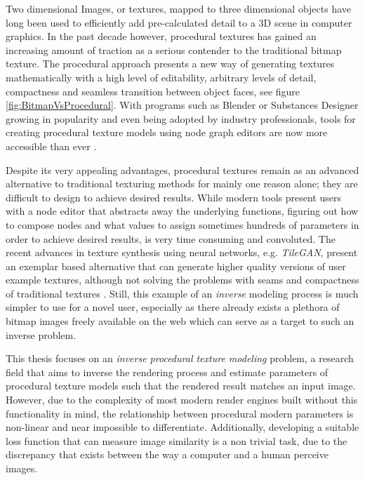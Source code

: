 Two dimensional Images, or textures, mapped to three dimensional objects have long been used to efficiently add pre-calculated detail to a 3D scene in computer graphics. In the past decade however, procedural textures has gained an increasing amount of traction as a serious contender to the traditional bitmap texture. The procedural approach presents a new way of generating textures mathematically with a high level of editability, arbitrary levels of detail, compactness and seamless transition between object faces, see figure \ref{fig:BitmapVsProcedural}. With programs such as Blender or Substances Designer growing in popularity and even being adopted by industry professionals, tools for creating procedural texture models using node graph editors are now more accessible than ever \cite{blenderfoundation_2020_blenderorg, a2020_substance}. 

Despite its very appealing advantages, procedural textures remain as an advanced alternative to traditional texturing methods for mainly one reason alone; they are difficult to design to achieve desired results. While modern tools present users with a node editor that abstracts away the underlying functions, figuring out how to compose nodes and what values to assign sometimes hundreds of parameters in order to achieve desired results, is very time consuming and convoluted. The recent advances in texture synthesis using neural networks, e.g. \textit{TileGAN}, present an exemplar based alternative that can generate higher quality versions of user example textures, although not solving the problems with seams and compactness of traditional textures \cite{frhstck_2019_tilegan}. Still, this example of an \textit{inverse} modeling process is much simpler to use for a novel user, especially as there already exists a plethora of bitmap images freely available on the web which can serve as a target to such an inverse problem. 

This thesis focuses on an \textit{inverse procedural texture modeling} problem, a research field that aims to inverse the rendering process and estimate parameters of procedural texture models such that the rendered result matches an input image. However, due to the complexity of most modern render engines built without this functionality in mind, the relationship between procedural modern parameters is non-linear and near impossible to differentiate. Additionally, developing a suitable loss function that can measure image similarity is a non trivial task, due to the discrepancy that exists between the way a computer and a human perceive images.

